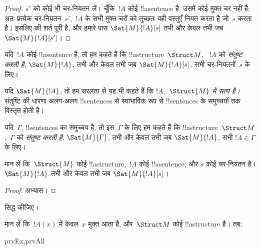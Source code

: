 \documentclass[../../../include/open-logic-section]{subfiles}
\begin{document}
\begin{proof}
  $s'$ को कोई भी चर-नियतन लें। चूँकि~$!A$ कोई !!a{sentence} है, उसमें
  कोई मुक्त चर नहीं है; अतः प्रत्येक चर-नियतन~$s'$,~$!A$ के सभी मुक्त
  चरों को तुच्छतः वही वस्तुएँ नियत करता है जो~$s$ करता है। इसलिए
   की शर्त पूरी है, और हमारे पास
  $\Sat{M}{!A}[s]$ तभी और केवल तभी जब $\Sat{M}{!A}[s']$।
\end{proof}

\begin{defn}
यदि~$!A$ कोई !!a{sentence} है, तो हम कहते हैं कि !!a{structure}~$\Struct M$,
~$!A$ को \emph{संतुष्ट करती है}, $\Sat{M}{!A}$, तभी और केवल तभी जब
$\Sat{M}{!A}[s]$, सभी चर-नियतनों~$s$ के लिए।
\end{defn}

यदि $\Sat{M}{!A}$, तो हम सरलता से यह भी कहते हैं कि
\emph{$!A$,~$\Struct{M}$ में सत्य है।} संतुष्टि की धारणा अलग-अलग
!!{sentence}s से स्वाभाविक रूप से !!{sentence}s के समुच्चयों तक विस्तृत
होती है।

\begin{defn}
यदि~$\Gamma$, !!{sentence}s का समुच्चय है, तो इस~$\Gamma$ के लिए हम कहते हैं कि
!!a{structure}~$\Struct M$,~$\Gamma$ को \emph{संतुष्ट करती है},
$\Sat{M}{\Gamma}$, तभी और केवल तभी जब $\Sat{M}{!A}$, सभी $!A \in \Gamma$
के लिए।
\end{defn}

\begin{prop}
  मान लें कि~$\Struct{M}$ कोई !!a{structure},~$!A$ कोई !!a{sentence}, और
  $s$ कोई चर-नियतन है। $\Sat{M}{!A}$ तभी और केवल तभी जब
  $\Sat{M}{!A}[s]$।
\end{prop}

\begin{proof}
अभ्यास।
\end{proof}

\begin{prob}
 सिद्ध कीजिए।
\end{prob}

\begin{prop}
  मान लें कि~$!A(x)$ में केवल~$x$ मुक्त आता है, और~$\Struct M$ कोई
  !!a{structure} है। तब:
  \begin{tagenumerate}{prvEx,prvAll}
\end{tagenumerate}
\end{prop}
\end{document}
